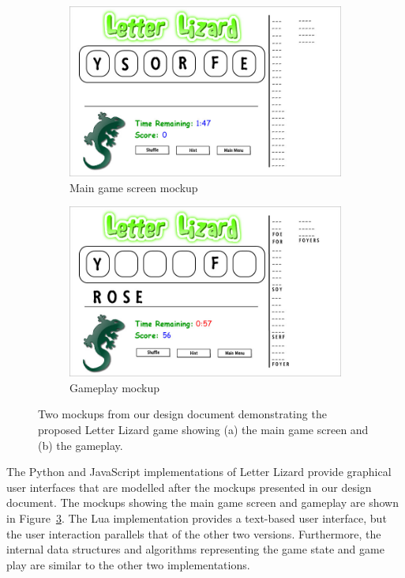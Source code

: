 \begin{figure}
    \centering
    \begin{subfigure}{0.49\textwidth}
        \includegraphics[width=\textwidth]{../mockups/Game_Screen.jpg}
        \caption{Main game screen mockup}
        \label{mainscreenmockup}
    \end{subfigure}
    \begin{subfigure}{0.49\textwidth}
        \includegraphics[width=\textwidth]{../mockups/Gameplay.jpg}
        \caption{Gameplay mockup}
        \label{gameplaymockup}
    \end{subfigure}
    \caption{Two mockups from our design document demonstrating the proposed Letter Lizard game
    showing (a) the main game screen and (b) the gameplay.}
    \label{mockups}
\end{figure}

The Python and JavaScript implementations of Letter Lizard provide graphical user interfaces
that are modelled after the mockups presented in our design document. The mockups showing the
main game screen and gameplay are shown in Figure~\ref{mockups}. The Lua implementation provides
a text-based user interface\footnotemark,
but the user interaction parallels that of the other two versions.
Furthermore, the internal data structures and algorithms representing the game state and game play
are similar to the other two implementations.


